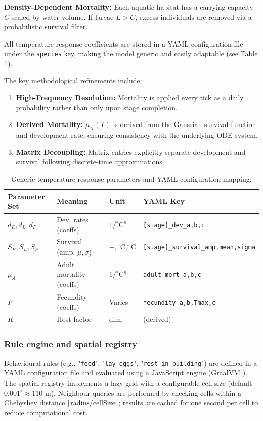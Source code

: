 \documentclass{article}
\begin{document}
\textbf{Density-Dependent Mortality:} Each aquatic habitat has a carrying capacity $C$ scaled by water volume. If larvae $L > C$, 
excess individuals are removed via a probabilistic survival filter.

All temperature-response coefficients are stored in a YAML configuration file under the \texttt{species} key, making the model 
generic and easily adaptable (see Table \ref{tab:lifecycle_params}).

The key methodological refinements include:
\begin{enumerate}
    \item \textbf{High-Frequency Resolution:} Mortality is applied every tick as a daily probability rather than only upon stage completion.
    \item \textbf{Derived Mortality:} $\mu_X(T)$ is derived from the Gaussian survival function and development rate, ensuring consistency 
    with the underlying ODE system.
    \item \textbf{Matrix Decoupling:} Matrix entries explicitly separate development and survival following discrete-time approximations.
\end{enumerate}

\begin{table}[!htb]
\centering
\caption{Generic temperature-response parameters and YAML configuration mapping.}
\label{tab:lifecycle_params}
\begin{tabular}{llll}
\toprule
\textbf{Parameter Set} & \textbf{Meaning} & \textbf{Unit} & \textbf{YAML Key} \\ \midrule
$d_E, d_L, d_P$ & Dev. rates (coeffs) & $1/^\circ\text{C}^n$ & \texttt{[stage]\_dev\_a,b,c} \\
$S_E, S_L, S_P$ & Survival (amp, $\mu, \sigma$) & $-, ^\circ\text{C}, ^\circ\text{C}$ & \texttt{[stage]\_survival\_amp,mean,sigma} \\
$\mu_A$ & Adult mortality (coeffs) & $1/^\circ\text{C}^n$ & \texttt{adult\_mort\_a,b,c} \\
$F$ & Fecundity (coeffs) & Varies & \texttt{fecundity\_a,b,Tmax,c} \\
$K$ & Host factor & dim. & (derived) \\ \bottomrule
\end{tabular}
\end{table}

\subsubsection{Rule engine and spatial registry}
Behavioural rules (e.g., "\texttt{feed}", "\texttt{lay\_eggs}", "\texttt{rest\_in\_building}") are defined in a YAML configuration 
file and evaluated using a JavaScript engine (GraalVM \citep{2023.VT.CPA}). The spatial registry implements a lazy grid with a configurable cell size 
(default $0.001^\circ \approx 110$ m). Neighbour queries are performed by checking cells within a Chebyshev distance 
$\lceil \text{radius}/\text{cellSize}\rceil$; results are cached for one second per cell to reduce computational cost.
\end{document}
